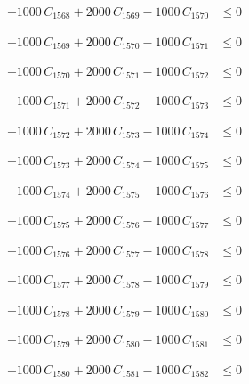 \documentclass[a4paper,11pt]{article}
\begin{document}
\begin{align}
-1000\,C_{1568} + 2000\,C_{1569} - 1000\,C_{1570} &\leq 0 \nonumber
\end{align}

\begin{align}
-1000\,C_{1569} + 2000\,C_{1570} - 1000\,C_{1571} &\leq 0 \nonumber
\end{align}

\begin{align}
-1000\,C_{1570} + 2000\,C_{1571} - 1000\,C_{1572} &\leq 0 \nonumber
\end{align}

\begin{align}
-1000\,C_{1571} + 2000\,C_{1572} - 1000\,C_{1573} &\leq 0 \nonumber
\end{align}

\begin{align}
-1000\,C_{1572} + 2000\,C_{1573} - 1000\,C_{1574} &\leq 0 \nonumber
\end{align}

\begin{align}
-1000\,C_{1573} + 2000\,C_{1574} - 1000\,C_{1575} &\leq 0 \nonumber
\end{align}

\begin{align}
-1000\,C_{1574} + 2000\,C_{1575} - 1000\,C_{1576} &\leq 0 \nonumber
\end{align}

\begin{align}
-1000\,C_{1575} + 2000\,C_{1576} - 1000\,C_{1577} &\leq 0 \nonumber
\end{align}

\begin{align}
-1000\,C_{1576} + 2000\,C_{1577} - 1000\,C_{1578} &\leq 0 \nonumber
\end{align}

\begin{align}
-1000\,C_{1577} + 2000\,C_{1578} - 1000\,C_{1579} &\leq 0 \nonumber
\end{align}

\begin{align}
-1000\,C_{1578} + 2000\,C_{1579} - 1000\,C_{1580} &\leq 0 \nonumber
\end{align}

\begin{align}
-1000\,C_{1579} + 2000\,C_{1580} - 1000\,C_{1581} &\leq 0 \nonumber
\end{align}

\begin{align}
-1000\,C_{1580} + 2000\,C_{1581} - 1000\,C_{1582} &\leq 0 \nonumber
\end{align}
\end{document}
